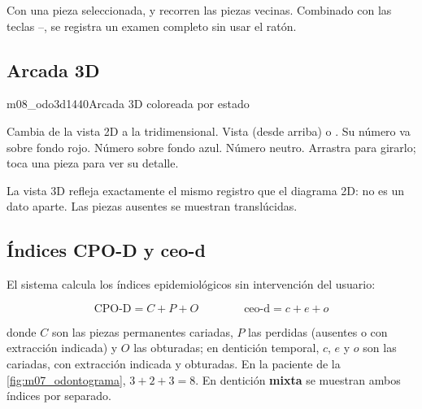 \documentclass[11pt]{article}
\begin{document}
\begin{sdconsejo}
Con una pieza seleccionada, \tecla{$\leftarrow$} y \tecla{$\rightarrow$} recorren las piezas vecinas. Combinado con las teclas –, se registra un examen completo sin usar el ratón.
\end{sdconsejo}

\needspace{0.55\textheight}
\subsection{Arcada 3D}

\begin{pantalla}{m08_odo3d}{1440}{Arcada 3D coloreada por estado}
\end{pantalla}

\begin{leyenda}
   Cambia de la vista 2D a la tridimensional.
   Vista  (desde arriba) o .
   Su número va sobre fondo rojo.
   Número sobre fondo azul.
   Número neutro.
   Arrastra para girarlo; toca una pieza para ver su detalle.
\end{leyenda}

\begin{sdnota}
La vista 3D refleja exactamente el mismo registro que el diagrama 2D: no es un dato aparte. Las piezas ausentes se muestran translúcidas.
\end{sdnota}

\subsection{Índices CPO-D y ceo-d}

El sistema calcula los índices epidemiológicos sin intervención del usuario:

\[
\text{CPO-D} = C + P + O \qquad\qquad \text{ceo-d} = c + e + o
\]

donde $C$ son las piezas permanentes cariadas, $P$ las perdidas (ausentes o con extracción indicada) y $O$ las obturadas; en dentición temporal, $c$, $e$ y $o$ son las cariadas, con extracción indicada y obturadas. En la paciente de la \cref{fig:m07_odontograma}, $3 + 2 + 3 = 8$. En dentición \textbf{mixta} se muestran ambos índices por separado.
\end{document}
